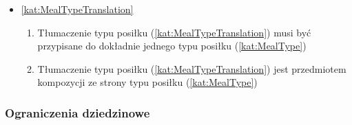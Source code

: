 \begin{itemize}[label={\textbf{Reguły dla}}, wide, labelwidth=!, labelindent=0pt]
\begin{enumerate}[label={\textbf{REG/2/\protect\twodigits{\arabic{enumi}}}}, wide, labelwidth=!, align=left, leftmargin=3cm, resume]
    \end{enumerate}
    \item\ref{kat:MealTypeTranslation}\mynobreakpar
    \begin{enumerate}[label={\textbf{REG/2/\protect\twodigits{\arabic{enumi}}}}, wide, labelwidth=!, align=left, leftmargin=3cm, resume]
        \item Tłumaczenie typu posiłku (\ref{kat:MealTypeTranslation}) musi być przypisane do dokładnie jednego typu posiłku (\ref{kat:MealType})
        \item Tłumaczenie typu posiłku (\ref{kat:MealTypeTranslation}) jest przedmiotem kompozycji ze strony typu posiłku (\ref{kat:MealType})
    \end{enumerate}
\end{itemize}

\subsubsection{Ograniczenia dziedzinowe}\label{subsubsec:database:recipes:restrictions}

